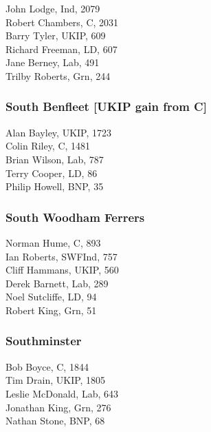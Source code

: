\documentclass[a4paper,openany,10pt]{book}
\begin{document}


John Lodge, Ind, 2079\\
Robert Chambers, C, 2031\\
Barry Tyler, UKIP, 609\\
Richard Freeman, LD, 607\\
Jane Berney, Lab, 491\\
Trilby Roberts, Grn, 244\\


\subsubsection*{South Benfleet \hspace*{\fill}\nolinebreak[1]%
\enspace\hspace*{\fill}
[UKIP gain from C]}



Alan Bayley, UKIP, 1723\\
Colin Riley, C, 1481\\
Brian Wilson, Lab, 787\\
Terry Cooper, LD, 86\\
Philip Howell, BNP, 35\\


\subsubsection*{South Woodham Ferrers}



Norman Hume, C, 893\\
Ian Roberts, SWFInd, 757\\
Cliff Hammans, UKIP, 560\\
Derek Barnett, Lab, 289\\
Noel Sutcliffe, LD, 94\\
Robert King, Grn, 51\\


\subsubsection*{Southminster}



Bob Boyce, C, 1844\\
Tim Drain, UKIP, 1805\\
Leslie McDonald, Lab, 643\\
Jonathan King, Grn, 276\\
Nathan Stone, BNP, 68\\
\end{document}
